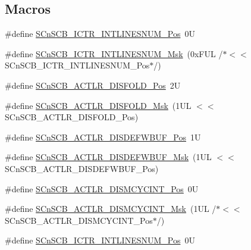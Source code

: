 \subsection*{Macros}
\begin{DoxyCompactItemize}
\item 
\#define \hyperlink{group___c_m_s_i_s___s_cn_s_c_b_ga0777ddf379af50f9ca41d40573bfffc5}{S\+Cn\+S\+C\+B\+\_\+\+I\+C\+T\+R\+\_\+\+I\+N\+T\+L\+I\+N\+E\+S\+N\+U\+M\+\_\+\+Pos}~0U
\item 
\#define \hyperlink{group___c_m_s_i_s___s_cn_s_c_b_ga3efa0f5210051464e1034b19fc7b33c7}{S\+Cn\+S\+C\+B\+\_\+\+I\+C\+T\+R\+\_\+\+I\+N\+T\+L\+I\+N\+E\+S\+N\+U\+M\+\_\+\+Msk}~(0x\+F\+U\+L /$\ast$$<$$<$ S\+Cn\+S\+C\+B\+\_\+\+I\+C\+T\+R\+\_\+\+I\+N\+T\+L\+I\+N\+E\+S\+N\+U\+M\+\_\+\+Pos$\ast$/)
\item 
\#define \hyperlink{group___c_m_s_i_s___s_cn_s_c_b_gaab395870643a0bee78906bb15ca5bd02}{S\+Cn\+S\+C\+B\+\_\+\+A\+C\+T\+L\+R\+\_\+\+D\+I\+S\+F\+O\+L\+D\+\_\+\+Pos}~2U
\item 
\#define \hyperlink{group___c_m_s_i_s___s_cn_s_c_b_gaa9dd2d4a2350499188f438d0aa9fd982}{S\+Cn\+S\+C\+B\+\_\+\+A\+C\+T\+L\+R\+\_\+\+D\+I\+S\+F\+O\+L\+D\+\_\+\+Msk}~(1\+U\+L $<$$<$ S\+Cn\+S\+C\+B\+\_\+\+A\+C\+T\+L\+R\+\_\+\+D\+I\+S\+F\+O\+L\+D\+\_\+\+Pos)
\item 
\#define \hyperlink{group___c_m_s_i_s___s_cn_s_c_b_gafa2eb37493c0f8dae77cde81ecf80f77}{S\+Cn\+S\+C\+B\+\_\+\+A\+C\+T\+L\+R\+\_\+\+D\+I\+S\+D\+E\+F\+W\+B\+U\+F\+\_\+\+Pos}~1U
\item 
\#define \hyperlink{group___c_m_s_i_s___s_cn_s_c_b_ga6cda7b7219232a008ec52cc8e89d5d08}{S\+Cn\+S\+C\+B\+\_\+\+A\+C\+T\+L\+R\+\_\+\+D\+I\+S\+D\+E\+F\+W\+B\+U\+F\+\_\+\+Msk}~(1\+U\+L $<$$<$ S\+Cn\+S\+C\+B\+\_\+\+A\+C\+T\+L\+R\+\_\+\+D\+I\+S\+D\+E\+F\+W\+B\+U\+F\+\_\+\+Pos)
\item 
\#define \hyperlink{group___c_m_s_i_s___s_cn_s_c_b_gaaa3e79f5ead4a32c0ea742b2a9ffc0cd}{S\+Cn\+S\+C\+B\+\_\+\+A\+C\+T\+L\+R\+\_\+\+D\+I\+S\+M\+C\+Y\+C\+I\+N\+T\+\_\+\+Pos}~0U
\item 
\#define \hyperlink{group___c_m_s_i_s___s_cn_s_c_b_ga2a2818f0489ad10b6ea2964e899d4cbc}{S\+Cn\+S\+C\+B\+\_\+\+A\+C\+T\+L\+R\+\_\+\+D\+I\+S\+M\+C\+Y\+C\+I\+N\+T\+\_\+\+Msk}~(1\+U\+L /$\ast$$<$$<$ S\+Cn\+S\+C\+B\+\_\+\+A\+C\+T\+L\+R\+\_\+\+D\+I\+S\+M\+C\+Y\+C\+I\+N\+T\+\_\+\+Pos$\ast$/)
\item 
\#define \hyperlink{group___c_m_s_i_s___s_cn_s_c_b_ga0777ddf379af50f9ca41d40573bfffc5}{S\+Cn\+S\+C\+B\+\_\+\+I\+C\+T\+R\+\_\+\+I\+N\+T\+L\+I\+N\+E\+S\+N\+U\+M\+\_\+\+Pos}~0U

\end{DoxyCompactItemize}
